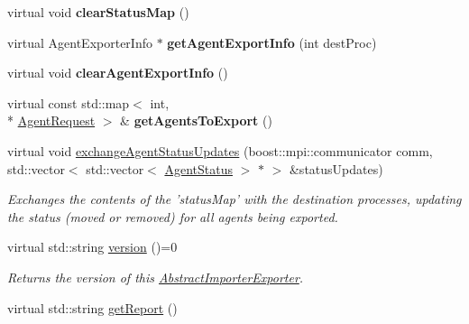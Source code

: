 \begin{DoxyCompactItemize}
\item 
\hypertarget{classrepast_1_1_abstract_importer_exporter_a007e8c17c3fa161f7ad1439074ed56d2}{virtual void {\bfseries clear\-Status\-Map} ()}\label{classrepast_1_1_abstract_importer_exporter_a007e8c17c3fa161f7ad1439074ed56d2}

\item 
\hypertarget{classrepast_1_1_abstract_importer_exporter_a402a82879f25681477af4d3665aa5f6d}{virtual Agent\-Exporter\-Info $\ast$ {\bfseries get\-Agent\-Export\-Info} (int dest\-Proc)}\label{classrepast_1_1_abstract_importer_exporter_a402a82879f25681477af4d3665aa5f6d}

\item 
\hypertarget{classrepast_1_1_abstract_importer_exporter_af83c0409da5354cb6a48641517e174f5}{virtual void {\bfseries clear\-Agent\-Export\-Info} ()}\label{classrepast_1_1_abstract_importer_exporter_af83c0409da5354cb6a48641517e174f5}

\item 
\hypertarget{classrepast_1_1_abstract_importer_exporter_aa88970b511ae80858bb67a9d825a5ba6}{virtual const std\-::map$<$ int, \\*
\hyperlink{classrepast_1_1_agent_request}{Agent\-Request} $>$ \& {\bfseries get\-Agents\-To\-Export} ()}\label{classrepast_1_1_abstract_importer_exporter_aa88970b511ae80858bb67a9d825a5ba6}

\item 
virtual void \hyperlink{classrepast_1_1_abstract_importer_exporter_acdfe1c21e1e6e1c49e06c08413439e3c}{exchange\-Agent\-Status\-Updates} (boost\-::mpi\-::communicator comm, std\-::vector$<$ std\-::vector$<$ \hyperlink{classrepast_1_1_agent_status}{Agent\-Status} $>$ $\ast$ $>$ \&status\-Updates)
\begin{DoxyCompactList}\small\item\em Exchanges the contents of the 'status\-Map' with the destination processes, updating the status (moved or removed) for all agents being exported. \end{DoxyCompactList}\item 
virtual std\-::string \hyperlink{classrepast_1_1_abstract_importer_exporter_a27a52b5ec4ec41e3ed6bf1c8819c25fc}{version} ()=0
\begin{DoxyCompactList}\small\item\em Returns the version of this \hyperlink{classrepast_1_1_abstract_importer_exporter}{Abstract\-Importer\-Exporter}. \end{DoxyCompactList}\item 
\hypertarget{classrepast_1_1_abstract_importer_exporter_ab9cf2ceec7a25942ad964ae426c906c0}{virtual std\-::string \hyperlink{classrepast_1_1_abstract_importer_exporter_ab9cf2ceec7a25942ad964ae426c906c0}{get\-Report} ()}\label{classrepast_1_1_abstract_importer_exporter_ab9cf2ceec7a25942ad964ae426c906c0}


\end{DoxyCompactItemize}
